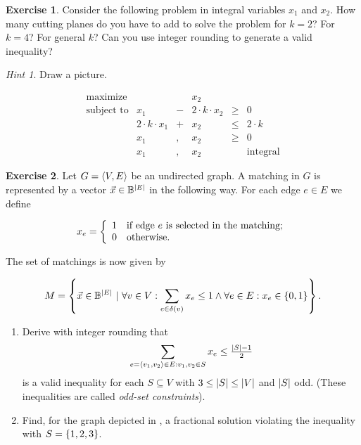 \documentclass[titlepage]{book}
\makeatletter
\newcommand{\concept}[1]{\toindex{#1}\indexlayout{#1}}
\newcommand{\indexlayout}[1]{\emph{#1}}
\newcommand\toindex{\@ifstar{\@dblarg{\@toindexs}}{\@toindex}}
\def\@toindexs[#1]#2{\index{#1@#2}}
\newcommand\@toindex[2][]{%
  \if\relax\detokenize{#1}\relax
    \begingroup
    \@splitword#2\@nil%
    \uppercase\expandafter{%
      \expandafter\def\expandafter\@initial\expandafter{\@first}}%
    \toks0=\expandafter{\@initial}%
    \toks2=\expandafter{\@rest}%
    \edef\x{\endgroup\noexpand\index{\the\toks0 \the\toks2 }}\x
  \else
    \index{#1}
  \fi
}
\def\@splitword#1#2\@nil{\def\@first{#1}\def\@rest{#2}}
\theoremstyle{plain}
\theoremstyle{definition}
\newtheorem{exercise}{Exercise}[chapter]
\theoremstyle{remark}
\newtheorem{hint}{Hint}
\makeatother
\begin{document}
\begin{exercise}
Consider the following problem in integral variables $x_1$ and $x_2$. How many cutting planes do you have to add to solve the problem for $k=2$? For $k=4$? For general $k$? Can you use integer rounding to generate a valid inequality?
\begin{hint}
Draw a picture.
\end{hint}
\begin{equation}
\begin{array}{rrcrcr}
\mbox{maximize}&&&x_2\\
\mbox{subject to}&x_1&-&2\cdot k\cdot x_2&\geq&0\\
&2\cdot k\cdot x_1&+&x_2&\leq&2\cdot k\\
&x_1&,&x_2&\geq&0\\
&x_1&,&x_2&&\mbox{integral}
\end{array}
\end{equation}
\end{exercise}
\begin{exercise}
Let $G=\tupl{V,E}$ be an undirected graph. A matching in $G$ is represented by a vector $\vec{x}\in\BoolSet^{\abs{E}}$ in the following way. For each edge $e\in E$ we define

\begin{equation}
\semboolvar{x_e}{if edge $e$ is selected in the matching;}{otherwise.}
\end{equation}

The set of matchings is now given by

\begin{equation}
M=\condset{\vec{x}\in\BoolSet^{|E|}}{\forall v\in V:\sumdomain[e]{\fun{\delta}{v}}{x_e}\leq 1\wedge\forall e\in E:x_e\in\accl{0,1}}.
\end{equation}

\begin{enumerate}
 \item Derive with integer rounding that
\begin{equation}
\sumdomain[e=\tupl{v_1,v_2}]{E:v_1,v_2\in S}{x_e}\leq\displaystyle\tfrac{\abs{S}-1}{2}
\eqnlab{matching-introunding}
\end{equation}
is a valid inequality for each $S\subseteq V$ with $3\leq\abs{S}\leq\abs{V}$ and $\abs{S}$ odd. (These inequalities are called \concept{odd-set constraints}).
 \item Find, for the graph depicted in , a fractional solution violating the inequality  with $S=\accl{1,2,3}$.
\end{enumerate}
\end{exercise}
\end{document}
